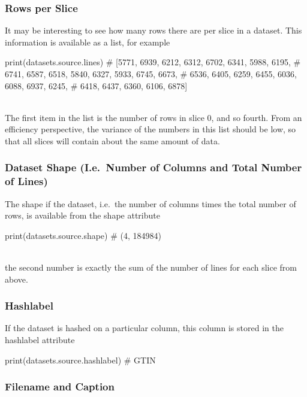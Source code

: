 \subsubsection{Rows per Slice}

It may be interesting to see how many rows there are per slice in a
dataset.  This information is available as a list, for example

\begin{python}
print(datasets.source.lines)
# [5771, 6939, 6212, 6312, 6702, 6341, 5988, 6195,
#  6741, 6587, 6518, 5840, 6327, 5933, 6745, 6673,
#  6536, 6405, 6259, 6455, 6036, 6088, 6937, 6245,
#  6418, 6437, 6360, 6106, 6878]
\end{python}
\\
The first item in the list is the number of rows in slice 0, and so
fourth.  From an efficiency perspective, the variance of the numbers
in this list should be low, so that all slices will contain about the
same amount of data.

\subsubsection{Dataset Shape (I.e.\ Number of Columns and Total Number
  of Lines)}

The shape if the dataset, i.e.\ the number of columns times the total
number of rows, is available from the shape attribute

\begin{python}
print(datasets.source.shape)
# (4, 184984)
\end{python}
\\
the second number is exactly the sum of the number of lines for each
slice from above.



\subsubsection{Hashlabel}

If the dataset is hashed on a particular column, this column is stored
in the hashlabel attribute

\begin{python}
print(datasets.source.hashlabel)
# GTIN
\end{python}



\subsubsection{Filename and Caption}

